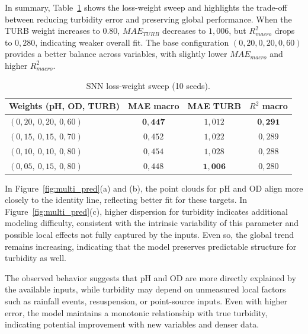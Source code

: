 In summary, Table~\ref{tab:snn_weight_sweep} shows the loss-weight sweep and highlights the trade-off
between reducing turbidity error and preserving global performance. When the TURB weight increases to
0.80, $MAE_{TURB}$ decreases to $1{,}006$, but $R^2_{macro}$ drops to $0{,}280$, indicating weaker
overall fit. The base configuration $(0{,}20,0{,}20,0{,}60)$ provides a better balance across variables,
with slightly lower $MAE_{macro}$ and higher $R^2_{macro}$.

\begin{table}[ht!]
\centering
\caption{SNN loss-weight sweep (10 seeds).}
\begin{tabular}{lccc}
\toprule
Weights (pH, OD, TURB) & MAE macro & MAE TURB & $R^2$ macro \\
\midrule
$(0{,}20,\ 0{,}20,\ 0{,}60)$ & $\mathbf{0{,}447}$ & $1{,}012$ & $\mathbf{0{,}291}$ \\
$(0{,}15,\ 0{,}15,\ 0{,}70)$ & $0{,}452$ & $1{,}022$ & $0{,}289$ \\
$(0{,}10,\ 0{,}10,\ 0{,}80)$ & $0{,}454$ & $1{,}028$ & $0{,}288$ \\
$(0{,}05,\ 0{,}15,\ 0{,}80)$ & $0{,}448$ & $\mathbf{1{,}006}$ & $0{,}280$ \\
\bottomrule
\end{tabular}
\label{tab:snn_weight_sweep}
\end{table}

In Figure~\ref{fig:multi_pred}(a) and (b), the point clouds for pH and OD align more closely to the
identity line, reflecting better fit for these targets. In Figure~\ref{fig:multi_pred}(c), higher
dispersion for turbidity indicates additional modeling difficulty, consistent with the intrinsic
variability of this parameter and possible local effects not fully captured by the inputs.
Even so, the global trend remains increasing, indicating that the model preserves predictable
structure for turbidity as well.

The observed behavior suggests that pH and OD are more directly explained by the available inputs,
while turbidity may depend on unmeasured local factors such as rainfall events, resuspension, or
point-source inputs. Even with higher error, the model maintains a monotonic relationship with
true turbidity, indicating potential improvement with new variables and denser data.

